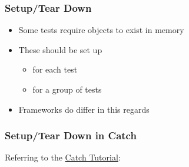 \subsubsection{Setup/Tear Down}\label{setuptear-down}

\begin{itemize}
\itemsep1pt\parskip0pt
\item
  Some tests require objects to exist in memory
\item
  These should be set up

  \begin{itemize}
  \itemsep1pt\parskip0pt
  \item
    for each test
  \item
    for a group of tests
  \end{itemize}
\item
  Frameworks do differ in this regards
\end{itemize}

\subsubsection{Setup/Tear Down in Catch}\label{setuptear-down-in-catch}

Referring to the
\href{https://github.com/philsquared/Catch/blob/master/docs/tutorial.md}{Catch
Tutorial}:

